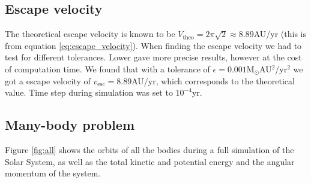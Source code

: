 \documentclass[reprint, english,notitlepage,nofootinbib]{revtex4-1}  %
\begin{document}
\subsection{Escape velocity}

The theoretical escape velocity is known to be $V_{\text{theo}} = 2\pi\sqrt{2} \approx 8.89$AU/yr (this is from equation \eqref{eq:escape_velocity}). When finding the escape velocity we had to test for different tolerances. Lower gave more precise results, however at the cost of computation time. We found that with a tolerance of $\epsilon = 0.001$M$_\odot$AU$^2$/yr$^2$ we got a escape velocity of $v_{\text{esc}} = 8.89$AU/yr, which corresponds to the theoretical value. Time step during simulation was set to $10^{-4}$yr.


\subsection{Many-body problem}

Figure \ref{fig:all} shows the orbits of all the bodies during a full simulation of the Solar System, as well as the total kinetic and potential energy and the angular momentum of the system.
\end{document}
